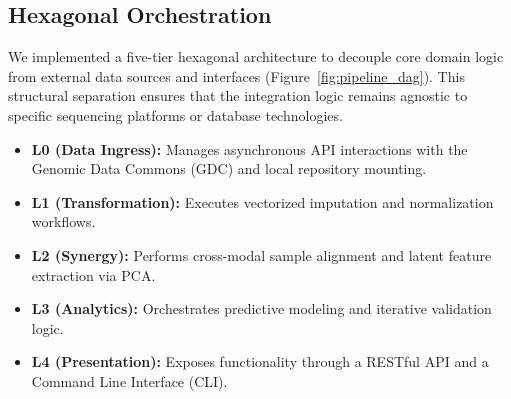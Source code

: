 \documentclass[sigconf,nonacm]{acmart}
\begin{document}
\subsection{Hexagonal Orchestration}
We implemented a five-tier hexagonal architecture to decouple core domain logic from external data sources and interfaces (Figure~\ref{fig:pipeline_dag}). This structural separation ensures that the integration logic remains agnostic to specific sequencing platforms or database technologies.
\begin{itemize}
    \item \textbf{L0 (Data Ingress):} Manages asynchronous API interactions with the Genomic Data Commons (GDC) and local repository mounting.
    \item \textbf{L1 (Transformation):} Executes vectorized imputation and normalization workflows.
    \item \textbf{L2 (Synergy):} Performs cross-modal sample alignment and latent feature extraction via PCA.
    \item \textbf{L3 (Analytics):} Orchestrates predictive modeling and iterative validation logic.
    \item \textbf{L4 (Presentation):} Exposes functionality through a RESTful API and a Command Line Interface (CLI).
\end{itemize}
\end{document}
